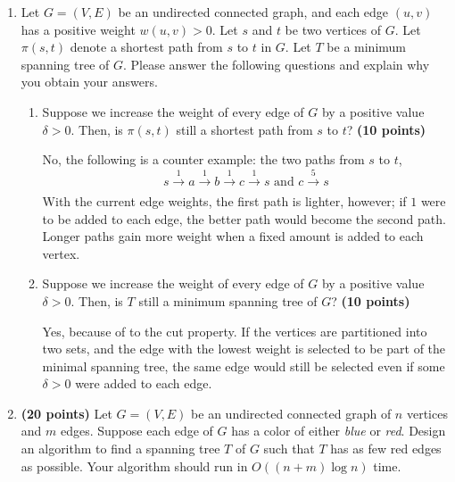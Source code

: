 \documentclass[11pt]{article}
\begin{document}
\begin{enumerate}
\begin{tcolorbox}[breakable]
\end{tcolorbox}

\item
Let $G=(V,E)$ be an undirected connected graph, and each edge $(u,v)$ has a positive weight $w(u,v)>0$. Let $s$ and $t$ be two vertices of $G$. Let $\pi(s,t)$ denote a shortest path from $s$ to $t$ in $G$. Let $T$ be a minimum spanning tree of $G$. Please answer the following questions and explain why you obtain your answers.

\begin{enumerate}
\item
Suppose we increase the weight of every edge of $G$ by a positive value $\delta>0$. Then, is $\pi(s,t)$ still a shortest path from $s$ to $t$?
{\hfill \bf (10 points)}

\begin{tcolorbox}
  No, the following is a counter example: the two paths from $s$ to $t$,
  \[s\xrightarrow{\text{1}}a\xrightarrow{\text{1}}b\xrightarrow[\text{}]{\text{1}}c\xrightarrow{\text{1}}s
  \text{ and }c\xrightarrow{\text{5}}s\] With the current edge weights, the first path is lighter,
  however; if $1$ were to be added to each edge, the better path would become the second path. Longer
  paths gain more weight when a fixed amount is added to each vertex.
\end{tcolorbox}

\item
Suppose we increase the weight of every edge of $G$ by a positive value $\delta>0$. Then, is $T$ still a minimum spanning tree of $G$?
{\hfill \bf (10 points)}

\begin{tcolorbox}
  Yes, because of to the cut property. If the vertices are partitioned into
  two sets, and the edge with the lowest weight is selected to be part of the minimal
  spanning tree, the same edge would still be selected even if some $\delta > 0$ were
  added to each edge.
\end{tcolorbox}

\end{enumerate}

\item
{\bf (20 points)}
Let $G=(V,E)$ be an undirected connected graph of $n$ vertices and $m$ edges. Suppose each edge of $G$ has a color of either {\em blue} or {\em red}. Design an algorithm to
find a spanning tree $T$ of $G$ such that $T$ has as few red edges as possible. Your algorithm should run in $O((n+m)\log n)$ time.


\end{enumerate}
\end{document}
